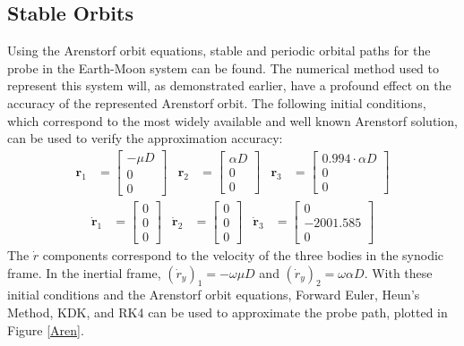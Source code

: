 \documentclass[conf]{new-aiaa}
\begin{document}
    \subsection{Stable Orbits}
    \label{Stable_O}
    Using the Arenstorf orbit equations, stable and periodic orbital paths for the probe in the Earth-Moon system can be found. The numerical method used to represent this system will, as demonstrated earlier, have a profound effect on the accuracy of the represented Arenstorf orbit. The following initial conditions, which correspond to the most widely available and well known Arenstorf solution, can be used to verify the approximation accuracy:
    \begin{align}
	    \bm{r}_1 &= \begin{bmatrix}
		-\mu D \\ 0 \\ 0
	    \end{bmatrix}
        &
	    \bm{r}_2 &= \begin{bmatrix}
		 \alpha D\\ 0 \\ 0
	    \end{bmatrix}
	    &
	    \bm{r}_3 &= \begin{bmatrix}
		 0.994 \cdot \alpha D\\ 0 \\ 0
	    \end{bmatrix}
	    \label{r_Ar}
    \end{align}
    \begin{align}
	    \dot{\bm{r}}_1 &= \begin{bmatrix}
		0 \\ 0 \\ 0
	    \end{bmatrix}
        &
	    \dot{\bm{r}}_2 &= \begin{bmatrix}
		0\\ 0 \\ 0
	    \end{bmatrix}
	    &
	    \dot{\bm{r}}_3 &= \begin{bmatrix}
		0\\ -2001.585 \\ 0
	    \end{bmatrix}
	    \label{vel_Ar}
    \end{align}
    The $\dot{r}$ components correspond to the velocity of the three bodies in the synodic frame. In the inertial frame, $(\dot{r}_y)_1=-\omega \mu D$ and $(\dot{r}_y)_2 = \omega \alpha D$. With these initial conditions and the Arenstorf orbit equations, Forward Euler, Heun's Method, KDK, and RK4 can be used to approximate the probe path, plotted in Figure \ref{Aren}.
\end{document}
